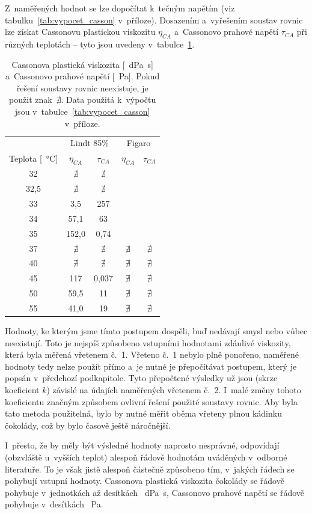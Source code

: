 \documentclass[12pt]{article}
\begin{document}
Z~naměřených hodnot se lze dopočítat k~tečným napětím (viz tabulku~\ref{tab:vypocet_casson} v~příloze). Dosazením a~vyřešením soustav rovnic lze získat Cassonovu plastickou viskozitu $\eta_{CA}$ a~Cassonovo prahové napětí $\tau_{CA}$ při různých teplotách -- tyto jsou uvedeny v~tabulce~\ref{tab:vysledky_casson}.
\begin{table}[h!]
    \centering
    \begin{tabular}{|c|c c|c c|}
        \hline
        & \multicolumn{2}{c|}{Lindt 85\%} & \multicolumn{2}{c|}{Figaro}\\
        Teplota [\SI{}{\degreeCelsius}] & $\eta_{CA}$ & $\tau_{CA}$ & $\eta_{CA}$ & $\tau_{CA}$ \\\hline
        32 & $\nexists$ & $\nexists$ & &\\
        32,5 & $\nexists$ & $\nexists$ & &\\
        33 & 3,5 & 257 & & \\
        34 & 57,1 & 63 & & \\
        35 & 152,0 & 0,74 & & \\
        37 & $\nexists$ & $\nexists$ & $\nexists$ & $\nexists$\\
        40 & $\nexists$ & $\nexists$ & $\nexists$ & $\nexists$\\
        45 & 117 & 0,037 & $\nexists$ & $\nexists$\\
        50 & 59,5 & 11 & $\nexists$ & $\nexists$\\
        55 & 41,0 & 19 & $\nexists$ & $\nexists$\\\hline 
    \end{tabular}
    \caption{Cassonova plastická viskozita [\SI{}{\deci\pascal\second}] a~Cassonovo prahové napětí [\SI{}{\pascal}]. Pokud řešení soustavy rovnic neexistuje, je použit znak~$\nexists$. Data použitá k~výpočtu jsou v~tabulce~\ref{tab:vypocet_casson} v~příloze.}
    \label{tab:vysledky_casson}
\end{table}
\par\noindent
Hodnoty, ke kterým jsme tímto postupem dospěli, buď nedávají smysl nebo vůbec neexistují. Toto je nejspíš způsobeno vstupními hodnotami zdánlivé viskozity, která byla měřená vřetenem č.~1. Vřeteno č.~1 nebylo plně ponořeno, naměřené hodnoty tedy nelze použít přímo a~je nutné je přepočítávat postupem, který je popsán v~předchozí podkapitole. Tyto přepočtené výsledky už jsou (skrze koeficient $k$) závislé na údajích naměřených vřetenem č.~2. I~malé změny tohoto koeficientu značným způsobem ovlivní řešení použité soustavy rovnic. Aby byla tato metoda použitelná, bylo by nutné měřit oběma vřeteny plnou kádinku čokolády, což by bylo časově ještě náročnější.
\par\noindent
I~přesto, že by měly být výsledné hodnoty naprosto nesprávné, odpovídají (obzvláště u~vyšších teplot) alespoň řádově hodnotám uváděných v~odborné literatuře. To je však jistě alespoň částečně způsobeno tím, v~jakých řádech se pohybují vstupní hodnoty. Cassonova plastická viskozita čokolády se řádově pohybuje v~jednotkách až desítkách \SI{}{\deci\pascal\second}, Cassonovo prahové napětí se řádově pohybuje v~desítkách \SI{}{\pascal}.~\cite{Article:Rapid_and_economic_chocolate_viscosity}\cite{Article:viscosity_molten_milk_chocolate}\cite{Article:chocolate_shear_stress}
\end{document}

